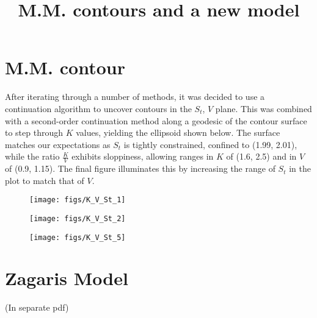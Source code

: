 \documentclass[11pt]{article}
\title{M.M. contours and a new model}
\begin{document}
\maketitle

\section{M.M. contour}

After iterating through a number of methods, it was decided to use a continuation algorithm to uncover contours in the $S_t$, $V$ plane. This was combined with a second-order continuation method along a geodesic of the contour surface to step through $K$ values, yielding the ellipsoid shown below. The surface matches our expectations as $S_t$ is tightly constrained, confined to (1.99, 2.01), while the ratio $\frac{K}{V}$ exhibits sloppiness, allowing ranges in $K$ of (1.6, 2.5) and in $V$ of (0.9, 1.15). The final figure illuminates this by increasing the range of $S_t$ in the plot to match that of $V$.

\begin{figure}[ht]
  \centering
  \texttt{[image: figs/K\_V\_St\_1]}
\end{figure}

\begin{figure}[ht]
  \centering
  \texttt{[image: figs/K\_V\_St\_2]}
\end{figure}



\begin{figure}[ht]
  \centering
  \texttt{[image: figs/K\_V\_St\_5]}
\end{figure}

\clearpage

\section{Zagaris Model}

(In separate pdf)

% 
% 
\end{document}
